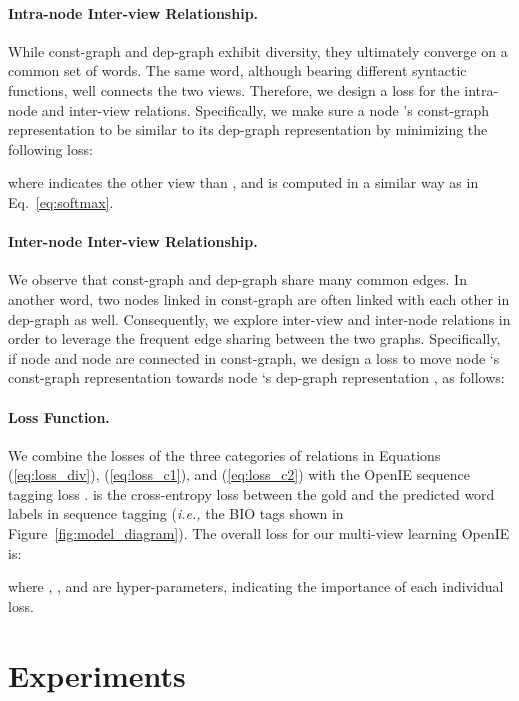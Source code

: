 \documentclass[11pt]{article}
\newcommand{\ie}{\emph{i.e.,}\xspace}
\begin{document}
\paragraph{Intra-node Inter-view Relationship.}
While const-graph and dep-graph exhibit diversity, they ultimately converge on a common set of words.
The same word, although bearing different syntactic functions, well connects the two views.
Therefore, we design a loss for the intra-node and inter-view relations. Specifically, we make sure a node 's const-graph representation  to be similar to its dep-graph representation  by minimizing the following loss:

where  indicates the other view than , and  is computed in a similar way as in Eq.~\ref{eq:softmax}.




\paragraph{Inter-node Inter-view Relationship.}
We observe that const-graph and dep-graph share many common edges. In another word, two nodes linked in const-graph are often linked with each other in dep-graph as well.
Consequently, we explore inter-view and inter-node relations in order to leverage the frequent edge sharing between the two graphs.
Specifically, if node  and node  are connected in const-graph, we design a loss to move node `s const-graph representation  towards node `s dep-graph representation , as follows:


\paragraph{Loss Function.}
We combine the losses of the three categories of relations in Equations (\ref{eq:loss_div}), (\ref{eq:loss_c1}), and (\ref{eq:loss_c2}) with the OpenIE sequence tagging loss .  is the cross-entropy loss between the gold and the predicted word labels in sequence tagging (\ie the BIO tags shown in Figure~\ref{fig:model_diagram}). The overall loss for our multi-view learning OpenIE is:

where  , , and  are hyper-parameters, indicating the importance of each individual loss. 

\section{Experiments}
\end{document}

